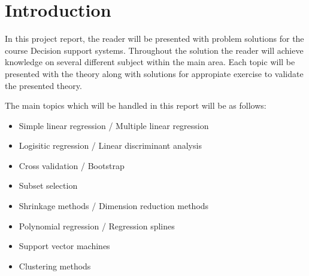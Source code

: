 \graphicspath{{Chapters/Indledning/}}

\chapter{Introduction}

In this project report, the reader will be presented with problem solutions for the course Decision support systems. Throughout the solution the reader will achieve knowledge on several different subject within the main area. Each topic will be presented with the theory along with solutions for appropiate exercise to validate the presented theory. 

The main topics which will be handled in this report will be as follows: 

\begin{itemize}
	\item Simple linear regression / Multiple linear regression
	\item Logisitic regression / Linear discriminant analysis
	\item Cross validation / Bootstrap
	\item Subset selection 
	\item Shrinkage methods / Dimension reduction methods 
	\item Polynomial regression / Regression splines
	\item Support vector machines
	\item Clustering methods
\end{itemize}